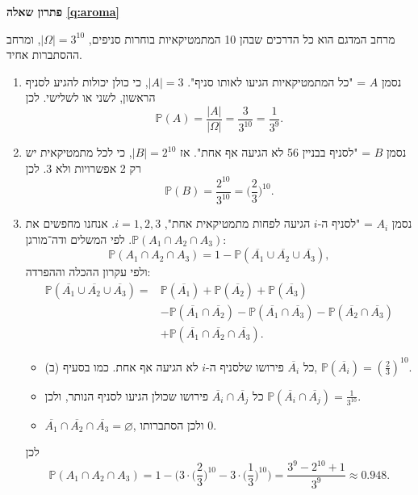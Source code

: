 \documentclass[11pt,a4paper]{report}
\newcommand{\flag}{\tikz[baseline=-0.1ex,x=0.9ex,y=0.9ex]{\draw[line width=0.5pt] (0,-0.3)--(0,1.6); \fill (0,1.6)--(1.2,1.2)--(0,0.8)--cycle;}}
\newcounter{todo}
\newcommand{\addtodo}[1]{\refstepcounter{todo}%
  \addcontentsline{tdo}{todo}{\protect\numberline{\thetodo}#1}}
\newcommand{\needcheck}[1]{\addtodo{#1}%
  {\color{todoc}\sffamily\small\,[\textbf{\flag{}\,\thetodo\ לבדיקה:} #1]\,}}
\renewcommand{\needcheck}[1]{}
\newcommand{\comp}[1]{\overline{#1}}
\renewcommand{\emptyset}{\varnothing}
\newcommand{\PP}{\mathbb{P}}
\newenvironment{solution}[1]{\par\bigskip\noindent
  {\sffamily\bfseries\color{thmc}פתרון שאלה \ref{q:#1}}\par\nopagebreak\smallskip}%
  {\par\medskip\noindent{\color{exc!50}\rule{\linewidth}{0.4pt}}\par}
\newcommand{\ans}[1]{\boxed{#1}}
\begin{document}
\begin{solution}{aroma}
מרחב המדגם הוא כל הדרכים שבהן 10 המתמטיקאיות בוחרות סניפים, $|\Omega|=3^{10}$, ומרחב ההסתברות אחיד.
\begin{enumerate}[label=(\alph*)]
  \item נסמן $A$ = "כל המתמטיקאיות הגיעו לאותו סניף". $|A|=3$, כי כולן יכולות להגיע לסניף הראשון, לשני או לשלישי. לכן
  \[
    \PP(A)=\frac{|A|}{|\Omega|}=\frac3{3^{10}}=\ans{\frac1{3^9}}.
  \]
  \item נסמן $B$ = "לסניף בבניין 56 לא הגיעה אף אחת". אז $|B|=2^{10}$, כי לכל מתמטיקאית יש רק 2 אפשרויות ולא 3. לכן
  \[
    \PP(B)=\frac{2^{10}}{3^{10}}=\ans{\Big(\frac23\Big)^{10}}.
  \]
  \item נסמן $A_i$ = "לסניף ה-$i$ הגיעה לפחות מתמטיקאית אחת", $i=1,2,3$. אנחנו מחפשים את $\PP(A_1\cap A_2\cap A_3)$. לפי המשלים ודה־מורגן:
  \[
    \PP(A_1\cap A_2\cap A_3)=1-\PP(\comp{A_1}\cup\comp{A_2}\cup\comp{A_3}),
  \]
  ולפי עקרון ההכלה וההפרדה:
  \[
  \begin{split}
    \PP(\comp{A_1}\cup\comp{A_2}\cup\comp{A_3})={}&\PP(\comp{A_1})+\PP(\comp{A_2})+\PP(\comp{A_3})\\
    &-\PP(\comp{A_1}\cap\comp{A_2})-\PP(\comp{A_1}\cap\comp{A_3})-\PP(\comp{A_2}\cap\comp{A_3})\\
    &+\PP(\comp{A_1}\cap\comp{A_2}\cap\comp{A_3}).
  \end{split}
  \]
  \needcheck{בדף הפתרונות נשמטו כמה סימני משלים בנוסחה (למשל $\PP(A_1\cap A_2^C)$); תיקנתי}
  \begin{itemize}
    \item כל $\comp{A_i}$ פירושו שלסניף ה-$i$ לא הגיעה אף אחת. כמו בסעיף (ב), $\PP(\comp{A_i})=(\frac23)^{10}$.
    \item כל $\comp{A_i}\cap\comp{A_j}$ פירושו שכולן הגיעו לסניף הנותר, ולכן $\PP(\comp{A_i}\cap\comp{A_j})=\frac1{3^{10}}$.
    \item $\comp{A_1}\cap\comp{A_2}\cap\comp{A_3}=\emptyset$, ולכן הסתברותו $0$.
  \end{itemize}
  לכן
  \[
    \PP(A_1\cap A_2\cap A_3)=1-\Big(3\cdot\Big(\frac23\Big)^{10}-3\cdot\Big(\frac13\Big)^{10}\Big)=\ans{\frac{3^9-2^{10}+1}{3^9}}\approx0.948.
  \]
\end{enumerate}
\end{solution}
\end{document}
